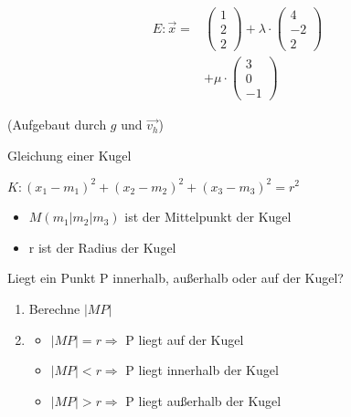 \documentclass[paper=a6,landscape,ngerman,twoside=true,fontsize=12pt]{scrartcl}
\begin{document}
\begin{antwort}
	
	\begin{align*}
	E:\vec{x}=&\left(\begin{array}{c} 1 \\ 2 \\ 2\end{array} \right)+\lambda \cdot \left(\begin{array}{c} 4 \\ -2 \\ 2\end{array} \right)\\
	&+\mu \cdot \left(\begin{array}{c} 3 \\0 \\ -1\end{array} \right)
	\end{align*}
	\begin{center}
	(Aufgebaut durch $g$ und $\vec{v_h}$)
	\end{center}
	
\end{antwort}	
\begin{frage}
	\LARGE
	Gleichung einer Kugel
\end{frage}
\begin{antwort}
	
	$K: (x_1-m_1)^2+(x_2-m_2)^2+(x_3-m_3)^2=r^2$
	
	\begin{itemize} 
		\item $M(m_1|m_2|m_3)$ ist der Mittelpunkt der Kugel
		\item r ist der Radius der Kugel	
	\end{itemize} 
\end{antwort}	
\begin{frage}
	\LARGE
	Liegt ein Punkt P innerhalb, außerhalb oder auf der Kugel?
\end{frage}
\begin{antwort}
		
	\begin{enumerate} 
		\item Berechne $|MP|$
		\item\normalsize 	\begin{itemize}
				\item $|MP|=r \Rightarrow$ P liegt auf der Kugel
				\item $|MP|<r \Rightarrow$ P liegt innerhalb der Kugel
				\item $|MP|>r \Rightarrow$ P liegt außerhalb der Kugel
				\end{itemize}	
	\end{enumerate} 
	
\end{antwort}	
\end{document}
